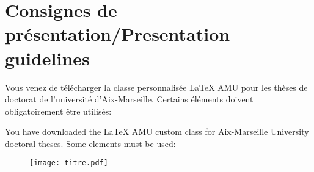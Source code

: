 \section{Consignes de présentation/Presentation guidelines}
\label{chap:consignes}

Vous venez de télécharger la classe personnalisée LaTeX AMU pour les thèses de doctorat de l'université d'Aix-Marseille.
Certains éléments doivent obligatoirement être utilisés:

You have downloaded the LaTeX AMU custom class for Aix-Marseille University doctoral theses.
Some elements must be used:
\\


\begin{figure}[h!tbp]
	\centering
	\texttt{[image: titre.pdf]}
\end{figure}

